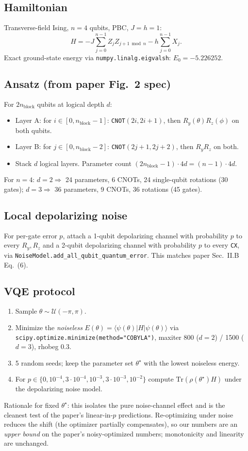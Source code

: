 \documentclass[11pt]{article}
\begin{document}
\subsection{Hamiltonian}
Transverse-field Ising, $n=4$ qubits, PBC, $J=h=1$:
\[
H = -J \sum_{j=0}^{n-1} Z_j Z_{j+1 \bmod n} - h \sum_{j=0}^{n-1} X_j.
\]
Exact ground-state energy via \texttt{numpy.linalg.eigvalsh}: $E_0 = -5.226252$.

\subsection{Ansatz (from paper Fig.~2 spec)}
For $2n_{\text{block}}$ qubits at logical depth $d$:
\begin{itemize}
\item Layer A: for $i \in [0, n_{\text{block}}-1]$: \texttt{CNOT}$(2i, 2i+1)$, then $R_y(\theta)R_z(\phi)$
on both qubits.
\item Layer B: for $j \in [0, n_{\text{block}}-2]$: \texttt{CNOT}$(2j+1, 2j+2)$, then $R_y R_z$ on both.
\item Stack $d$ logical layers. Parameter count $(2n_{\text{block}}-1)\cdot 4d = (n-1)\cdot 4d$.
\end{itemize}
For $n=4$: $d=2 \Rightarrow$ 24 parameters, 6 CNOTs, 24 single-qubit rotations (30 gates);
$d=3 \Rightarrow$ 36 parameters, 9 CNOTs, 36 rotations (45 gates).

\subsection{Local depolarizing noise}
For per-gate error $p$, attach a 1-qubit depolarizing channel with probability $p$ to every $R_y, R_z$
and a 2-qubit depolarizing channel with probability $p$ to every \texttt{CX}, via
\texttt{NoiseModel.add\_all\_qubit\_quantum\_error}. This matches paper Sec.~II.B Eq.~(6).

\subsection{VQE protocol}
\begin{enumerate}
\item Sample $\theta \sim \mathcal{U}(-\pi,\pi)$.
\item Minimize the \emph{noiseless} $E(\theta) = \langle\psi(\theta)|H|\psi(\theta)\rangle$ via
\texttt{scipy.optimize.minimize(method="COBYLA")}, maxiter 800 ($d=2$) / 1500 ($d=3$), rhobeg 0.3.
\item 5 random seeds; keep the parameter set $\theta^\star$ with the lowest noiseless energy.
\item For $p \in \{0, 10^{-4}, 3\cdot 10^{-4}, 10^{-3}, 3\cdot 10^{-3}, 10^{-2}\}$ compute
$\mathrm{Tr}(\rho(\theta^\star)H)$ under the depolarizing noise model.
\end{enumerate}
Rationale for fixed $\theta^\star$: this isolates the pure noise-channel effect and is the cleanest test
of the paper's linear-in-$p$ predictions. Re-optimizing under noise reduces the shift (the optimizer
partially compensates), so our numbers are an \emph{upper bound} on the paper's noisy-optimized numbers;
monotonicity and linearity are unchanged.
\end{document}
